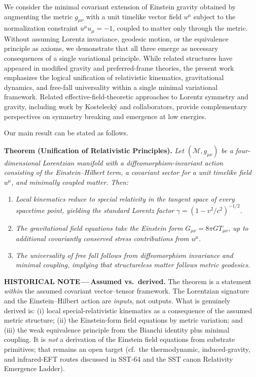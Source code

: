 \documentclass[11pt]{article}
\newcommand{\histnote}[1]{%
  \begin{histbox}
    {\small\color{histtext}\textbf{HISTORICAL NOTE\,---\,}#1}
  \end{histbox}}
\begin{document}
        We consider the minimal covariant extension of Einstein gravity obtained by
        augmenting the metric $g_{\mu\nu}$ with a unit timelike vector field $u^\mu$
        subject to the normalization constraint $u^\mu u_\mu=-1$, coupled to matter
        only through the metric.
        Without assuming Lorentz invariance, geodesic motion, or the equivalence
        principle as axioms, we demonstrate that all three emerge as necessary
        consequences of a single variational principle.
        While related structures have appeared in modified gravity and preferred-frame
        theories, the present work emphasizes the logical unification of relativistic
        kinematics, gravitational dynamics, and free-fall universality within a single
        minimal variational framework.
        Related effective-field-theoretic approaches to Lorentz symmetry and gravity,
        including work by Kosteleck\'y and collaborators, provide complementary
        perspectives on symmetry breaking and emergence at low energies.

        Our main result can be stated as follows.

        \medskip
        \noindent\textbf{Theorem (Unification of Relativistic Principles).}
        \emph{Let $(\mathcal{M},g_{\mu\nu})$ be a four-dimensional Lorentzian manifold
        with a diffeomorphism-invariant action consisting of the Einstein--Hilbert
        term, a covariant sector for a unit timelike field $u^\mu$, and minimally
        coupled matter.
        Then:}
        \begin{enumerate}
            \item \emph{Local kinematics reduce to special relativity in the tangent space
            of every spacetime point, yielding the standard Lorentz factor
                $\gamma=(1-v^2/c^2)^{-1/2}$.}
            \item \emph{The gravitational field equations take the Einstein form
                $G_{\mu\nu}=8\pi G T_{\mu\nu}$, up to additional covariantly conserved stress
                contributions from $u^\mu$.}
            \item \emph{The universality of free fall follows from diffeomorphism
            invariance and minimal coupling, implying that structureless matter follows
            metric geodesics.}
        \end{enumerate}

        \histnote{\textbf{Assumed vs.\ derived.}
        The theorem is a statement \emph{within} the assumed covariant vector--tensor
        framework. The Lorentzian signature and the Einstein--Hilbert action are
        \emph{inputs}, not outputs. What is genuinely derived is: (i) local
        special-relativistic kinematics as a consequence of the assumed metric
        structure; (ii) the Einstein-form field equations by metric variation; and
        (iii) the weak equivalence principle from the Bianchi identity plus minimal
        coupling. It is \emph{not} a derivation of the Einstein field equations from
        substrate primitives; that remains an open target (cf.\ the thermodynamic,
        induced-gravity, and infrared-EFT routes discussed in SST-64 and the SST
        canon Relativity Emergence Ladder).}
\end{document}
